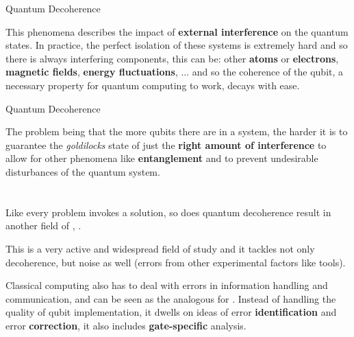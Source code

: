 \documentclass[aspectratio=43]{beamer}
\begin{document}
\begin{frame}{Quantum Decoherence}
    \begin{card}
        This phenomena describes the impact of \textbf{external interference} on the quantum states. In practice, the perfect isolation of these systems is extremely hard and so there is always interfering components, this can be: other \textbf{atoms} or \textbf{electrons}, \textbf{magnetic fields}, \textbf{energy fluctuations}, ... and so the coherence of the qubit, a necessary property for quantum computing to work, decays with ease.
    \end{card}
\pagenumber
\end{frame}
\begin{frame}{Quantum Decoherence}
    \begin{card}
        The problem being that the more qubits there are in a system, the harder it is to guarantee the \textit{goldilocks} state of just the \textbf{right amount of interference} to allow for other phenomena like \textbf{entanglement} and to prevent undesirable disturbances of the quantum system.
    \end{card}
\pagenumber
\end{frame}


\section{\qec}
\begin{frame}{\qec}
    \begin{card}
        Like every problem invokes a solution, so does quantum decoherence result in another field of \qc, \textbf{\qec}.
    \end{card}
    \begin{card}
        This is a very active and widespread field of study and it tackles not only decoherence, but noise as well (errors from other experimental factors like tools). 
    \end{card}
\pagenumber
\end{frame}

\begin{frame}{\qec}
    \begin{card}
        Classical computing also has to deal with errors in information handling and communication, and \qec can be seen as the analogous for \qc. Instead of handling the quality of qubit implementation, it dwells on ideas of error \textbf{identification} and error \textbf{correction}, it also includes \textbf{gate-specific} analysis.
    \end{card}
\pagenumber
\end{frame}
\end{document}
